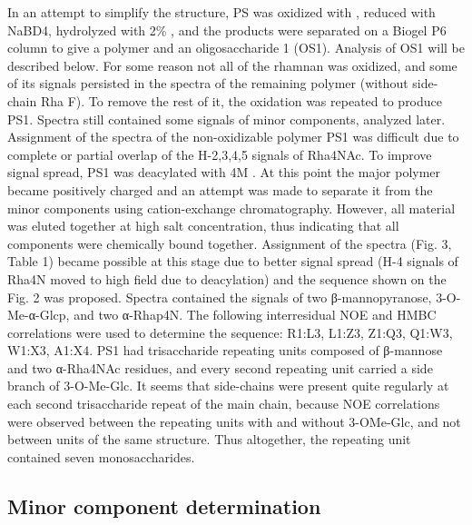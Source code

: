 		In an attempt to simplify the structure, \ac{PS} was oxidized with , reduced with NaBD4, hydrolyzed with 2\% , and the products were separated on a Biogel P6 column to give a polymer and an oligosaccharide 1 (\ac{OS}1). Analysis of \ac{OS}1 will be described below. For some reason not all of the rhamnan was oxidized, and some of its signals persisted in the spectra of the remaining polymer (without side-chain Rha F). To remove the rest of it, the oxidation was repeated to produce \ac{PS}1. Spectra still contained some signals of minor components, analyzed later. Assignment of the spectra of the non-oxidizable polymer \ac{PS}1 was difficult due to complete or partial overlap of the H-2,3,4,5 signals of Rha4NAc. To improve signal spread, \ac{PS}1 was deacylated with 4M . At this point the major polymer became positively charged and an attempt was made to separate it from the minor components using cation-exchange chromatography. However, all material was eluted together at high salt concentration, thus indicating that all components were chemically bound together. Assignment of the spectra (Fig. 3, Table 1) became possible at this stage due to better signal spread (H-4 signals of Rha4N moved to high field due to deacylation) and the sequence shown on the Fig. 2 was proposed. Spectra contained the signals of two β-mannopyranose, 3-O-Me-α-Glcp, and two α-Rhap4N. The following interresidual \ac{NOE} and \ac{HMBC} correlations were used to determine the sequence: R1:L3, L1:Z3, Z1:Q3, Q1:W3, W1:X3, A1:X4. \ac{PS}1 had trisaccharide repeating units composed of β-mannose and two α-Rha4NAc residues, and every second repeating unit carried a side branch of 3-O-Me-Glc. It seems that side-chains were present quite regularly at each second trisaccharide repeat of the main chain, because \ac{NOE} correlations were observed between the repeating units with and without 3-OMe-Glc, and not between units of the same structure. Thus altogether, the repeating unit contained seven monosaccharides.

	\subsection{Minor component determination} %
	\label{sub:minor_component_determination}

